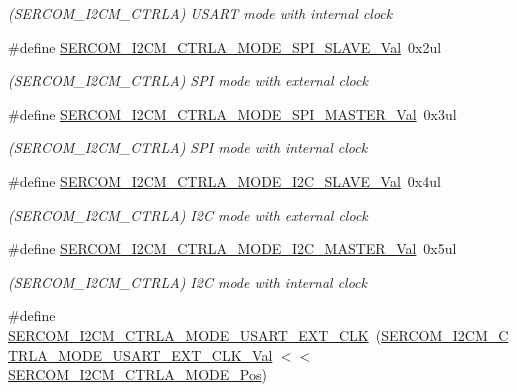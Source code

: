 \begin{DoxyCompactItemize}
\begin{DoxyCompactList}\small\item\em (S\+E\+R\+C\+O\+M\+\_\+\+I2\+C\+M\+\_\+\+C\+T\+R\+LA) U\+S\+A\+RT mode with internal clock \end{DoxyCompactList}\item 
\#define \mbox{\hyperlink{group___s_a_m_d21___s_e_r_c_o_m_ga7268ce7640152745d00cf5093295d904}{S\+E\+R\+C\+O\+M\+\_\+\+I2\+C\+M\+\_\+\+C\+T\+R\+L\+A\+\_\+\+M\+O\+D\+E\+\_\+\+S\+P\+I\+\_\+\+S\+L\+A\+V\+E\+\_\+\+Val}}~0x2ul
\begin{DoxyCompactList}\small\item\em (S\+E\+R\+C\+O\+M\+\_\+\+I2\+C\+M\+\_\+\+C\+T\+R\+LA) S\+PI mode with external clock \end{DoxyCompactList}\item 
\#define \mbox{\hyperlink{group___s_a_m_d21___s_e_r_c_o_m_gad011c7093cbb72132ef68a7d6cb197df}{S\+E\+R\+C\+O\+M\+\_\+\+I2\+C\+M\+\_\+\+C\+T\+R\+L\+A\+\_\+\+M\+O\+D\+E\+\_\+\+S\+P\+I\+\_\+\+M\+A\+S\+T\+E\+R\+\_\+\+Val}}~0x3ul
\begin{DoxyCompactList}\small\item\em (S\+E\+R\+C\+O\+M\+\_\+\+I2\+C\+M\+\_\+\+C\+T\+R\+LA) S\+PI mode with internal clock \end{DoxyCompactList}\item 
\#define \mbox{\hyperlink{group___s_a_m_d21___s_e_r_c_o_m_ga2d080c95cf1e8260bc1664b26815cbb5}{S\+E\+R\+C\+O\+M\+\_\+\+I2\+C\+M\+\_\+\+C\+T\+R\+L\+A\+\_\+\+M\+O\+D\+E\+\_\+\+I2\+C\+\_\+\+S\+L\+A\+V\+E\+\_\+\+Val}}~0x4ul
\begin{DoxyCompactList}\small\item\em (S\+E\+R\+C\+O\+M\+\_\+\+I2\+C\+M\+\_\+\+C\+T\+R\+LA) I2C mode with external clock \end{DoxyCompactList}\item 
\#define \mbox{\hyperlink{group___s_a_m_d21___s_e_r_c_o_m_gaa4074ce6bf300f8170295651758744ce}{S\+E\+R\+C\+O\+M\+\_\+\+I2\+C\+M\+\_\+\+C\+T\+R\+L\+A\+\_\+\+M\+O\+D\+E\+\_\+\+I2\+C\+\_\+\+M\+A\+S\+T\+E\+R\+\_\+\+Val}}~0x5ul
\begin{DoxyCompactList}\small\item\em (S\+E\+R\+C\+O\+M\+\_\+\+I2\+C\+M\+\_\+\+C\+T\+R\+LA) I2C mode with internal clock \end{DoxyCompactList}\item 
\#define \mbox{\hyperlink{group___s_a_m_d21___s_e_r_c_o_m_ga0424a5ff8f3525db09b5fb5e05a21b92}{S\+E\+R\+C\+O\+M\+\_\+\+I2\+C\+M\+\_\+\+C\+T\+R\+L\+A\+\_\+\+M\+O\+D\+E\+\_\+\+U\+S\+A\+R\+T\+\_\+\+E\+X\+T\+\_\+\+C\+LK}}~(\mbox{\hyperlink{group___s_a_m_d21___s_e_r_c_o_m_gac5166e5e3676938a383c34a8cfe47748}{S\+E\+R\+C\+O\+M\+\_\+\+I2\+C\+M\+\_\+\+C\+T\+R\+L\+A\+\_\+\+M\+O\+D\+E\+\_\+\+U\+S\+A\+R\+T\+\_\+\+E\+X\+T\+\_\+\+C\+L\+K\+\_\+\+Val}} $<$$<$ \mbox{\hyperlink{group___s_a_m_d21___s_e_r_c_o_m_gaa8f5b3c26e3c756262d48982291c7cce}{S\+E\+R\+C\+O\+M\+\_\+\+I2\+C\+M\+\_\+\+C\+T\+R\+L\+A\+\_\+\+M\+O\+D\+E\+\_\+\+Pos}})
$$
\end{DoxyCompactItemize}
